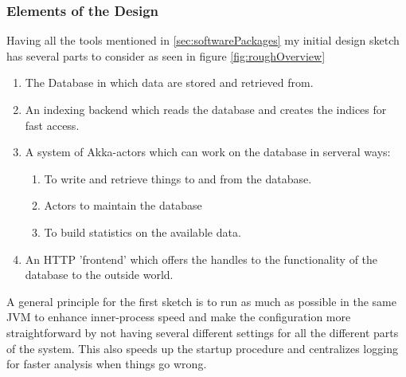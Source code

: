 \documentclass[11p]{scrartcl}
\begin{document}
\subsubsection{Elements of the Design}
Having all the tools mentioned in \ref{sec:softwarePackages} my initial design sketch has several parts to consider as seen in figure \ref{fig:roughOverview}
\begin{enumerate}
	\item The Database in which data are stored and retrieved from.
	\item An indexing backend which reads the database and creates the indices for fast access.
	\item A system of Akka-actors which can work on the database in serveral ways:
	\begin{enumerate}
		\item To write and retrieve things to and from the database.
		\item Actors to maintain the database
		\item To build statistics on the available data.		
	\end{enumerate}	
	\item An HTTP 'frontend' which offers the handles to the functionality of the database to the outside world.
\end{enumerate}

A general principle for the first sketch is to run as much as possible in the same JVM to enhance inner-process speed and make the configuration more straightforward by not having several different settings for all the different parts of the system. This also speeds up the startup procedure and centralizes logging for faster analysis when things go wrong. \\
\end{document}
